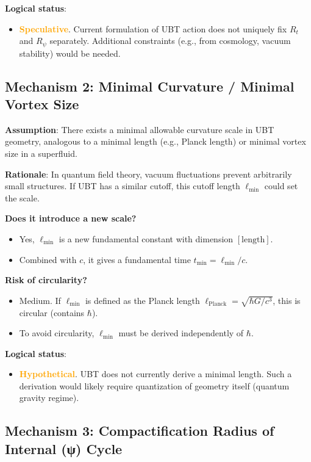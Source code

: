 \documentclass[12pt]{article}
\begin{document}
\textbf{Logical status}:
\begin{itemize}
\item \textcolor{orange}{\textbf{Speculative}}. Current formulation of UBT action does not uniquely fix $R_t$ and $R_\psi$ separately. Additional constraints (e.g., from cosmology, vacuum stability) would be needed.
\end{itemize}

\subsection{Mechanism 2: Minimal Curvature / Minimal Vortex Size}

\textbf{Assumption}: There exists a minimal allowable curvature scale in UBT geometry, analogous to a minimal length (e.g., Planck length) or minimal vortex size in a superfluid.

\textbf{Rationale}: In quantum field theory, vacuum fluctuations prevent arbitrarily small structures. If UBT has a similar cutoff, this cutoff length $\ell_{\text{min}}$ could set the scale.

\textbf{Does it introduce a new scale?}
\begin{itemize}
\item Yes, $\ell_{\text{min}}$ is a new fundamental constant with dimension $[\text{length}]$.
\item Combined with $c$, it gives a fundamental time $t_{\text{min}} = \ell_{\text{min}}/c$.
\end{itemize}

\textbf{Risk of circularity?}
\begin{itemize}
\item Medium. If $\ell_{\text{min}}$ is defined as the Planck length $\ell_{\text{Planck}} = \sqrt{\hbar G / c^3}$, this is circular (contains $\hbar$).
\item To avoid circularity, $\ell_{\text{min}}$ must be derived independently of $\hbar$.
\end{itemize}

\textbf{Logical status}:
\begin{itemize}
\item \textcolor{orange}{\textbf{Hypothetical}}. UBT does not currently derive a minimal length. Such a derivation would likely require quantization of geometry itself (quantum gravity regime).
\end{itemize}

\subsection{Mechanism 3: Compactification Radius of Internal (ψ) Cycle}
\end{document}
